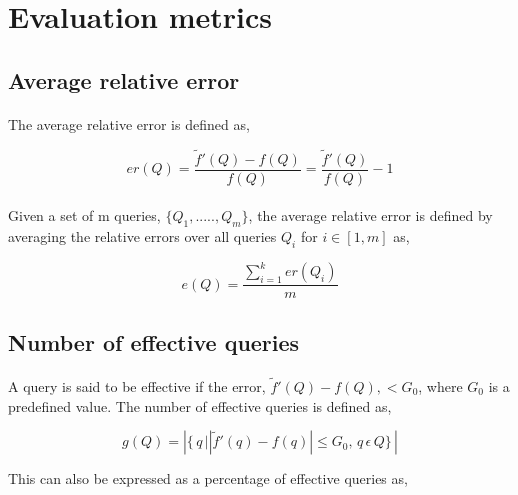\section{Evaluation metrics}
\label{section:design_evaluation_metrics}

\subsection{Average relative error}
\label{section:metrics_are}

\paragraph{}
The average relative error is defined as,

\begin{equation}
    er(Q) =  \frac{\tilde{f}'(Q) - f(Q)}{f(Q)} = \frac{\tilde{f}'(Q)}{f(Q)} -1
\end{equation}

\paragraph{}
Given a set of m queries, $\{ Q_1 , ....., Q_m \}$, the average relative error is defined by averaging the relative errors over all queries $Q_i$ for \(i \in [1,m]\) as,

\begin{equation}
    e(Q) =  \frac{\sum_{i=1}^{k} er(Q_i)}{m}
\end{equation}

\subsection{Number of effective queries}
\label{section:metrics_neq}

\paragraph{}
A query is said to be effective if the error, $\tilde{f}'(Q) - f(Q), < G_0$,  where $G_0$ is a predefined value. The number of effective queries is defined as,

\begin{equation}
    g(Q) =  \left | \{\,q\, |   \left |\tilde{f}'(q) - f(q)\right | \leq G_0, \,q \, \epsilon  \,Q\} \, \right|
\end{equation}

This can also be expressed as a percentage of effective queries as,

